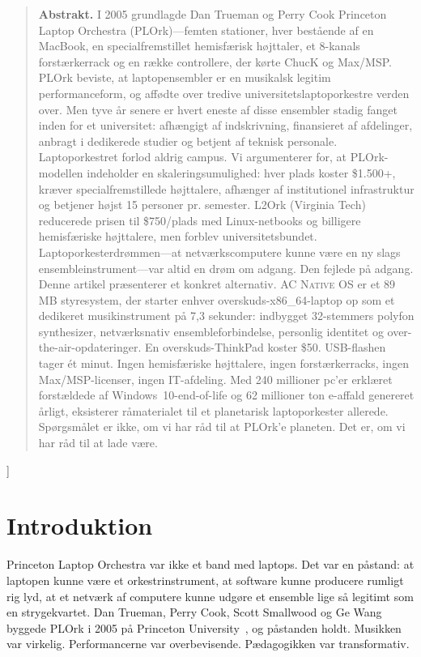 \documentclass[10pt,letterpaper,twocolumn]{article}
\newcommand{\acos}{\textsc{AC Native OS}}
\begin{document}
{\begin{quote}
\small\noindent\textbf{Abstrakt.}
I 2005 grundlagde Dan Trueman og Perry Cook Princeton Laptop Orchestra (PLOrk)---femten stationer, hver best{\aa}ende af en MacBook, en specialfremstillet hemisf{\ae}risk h{\o}jttaler, et 8-kanals forst{\ae}rkerrack og en r{\ae}kke controllere, der k{\o}rte ChucK og Max/MSP. PLOrk beviste, at laptopensembler er en musikalsk legitim performanceform, og aff{\o}dte over tredive universitetslaptoporkestre verden over. Men tyve {\aa}r senere er hvert eneste af disse ensembler stadig fanget inden for et universitet: afh{\ae}ngigt af indskrivning, finansieret af afdelinger, anbragt i dedikerede studier og betjent af teknisk personale. Laptoporkestret forlod aldrig campus. Vi argumenterer for, at PLOrk-modellen indeholder en skaleringsumulighed: hver plads koster \$1.500+, kr{\ae}ver specialfremstillede h{\o}jttalere, afh{\ae}nger af institutionel infrastruktur og betjener h{\o}jst 15 personer pr. semester. L2Ork (Virginia Tech) reducerede prisen til \$750/plads med Linux-netbooks og billigere hemisf{\ae}riske h{\o}jttalere, men forblev universitetsbundet. Laptoporkesterdr{\o}mmen---at netv{\ae}rkscomputere kunne v{\ae}re en ny slags ensembleinstrument---var altid en dr{\o}m om adgang. Den fejlede p{\aa} adgang. Denne artikel pr{\ae}senterer et konkret alternativ. \acos{} er et 89\,MB styresystem, der starter enhver overskuds-x86\_64-laptop op som et dedikeret musikinstrument p{\aa} 7,3 sekunder: indbygget 32-stemmers polyfon synthesizer, netv{\ae}rksnativ ensembleforbindelse, personlig identitet og over-the-air-opdateringer. En overskuds-ThinkPad koster \$50. USB-flashen tager \'{e}t minut. Ingen hemisf{\ae}riske h{\o}jttalere, ingen forst{\ae}rkerracks, ingen Max/MSP-licenser, ingen IT-afdeling. Med 240 millioner pc'er erkl{\ae}ret forst{\ae}ldede af Windows~10-end-of-life og 62 millioner ton e-affald genereret {\aa}rligt, eksisterer r{\aa}materialet til et planetarisk laptoporkester allerede. Sp{\o}rgsm{\aa}let er ikke, om vi har r{\aa}d til at PLOrk'e planeten. Det er, om vi har r{\aa}d til at lade v{\ae}re.
\end{quote}
\vspace{0.5em}
}]


\section{Introduktion}

Princeton Laptop Orchestra var ikke et band med laptops. Det var en p{\aa}stand: at laptopen kunne v{\ae}re et orkestrinstrument, at software kunne producere rumligt rig lyd, at et netv{\ae}rk af computere kunne udg{\o}re et ensemble lige s{\aa} legitimt som en strygekvartet. Dan Trueman, Perry Cook, Scott Smallwood og Ge Wang byggede PLOrk i 2005 p{\aa} Princeton University~\citep{trueman2006plork, trueman2007why}, og p{\aa}standen holdt. Musikken var virkelig. Performancerne var overbevisende. P{\ae}dagogikken var transformativ.
\end{document}
